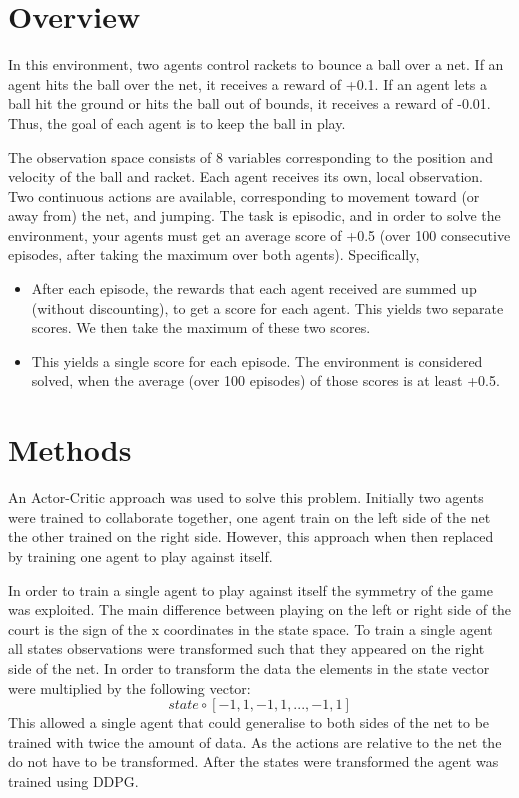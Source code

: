 \documentclass[12pt]{article}
\begin{document}
\maketitle


\section{Overview}

In this environment, two agents control rackets to bounce a ball over a net. 
If an agent hits the ball over the net, it receives a reward of +0.1. 
If an agent lets a ball hit the ground or hits the ball out of bounds, it receives a reward of -0.01. 
Thus, the goal of each agent is to keep the ball in play.

The observation space consists of 8 variables corresponding to the position and velocity of the ball and racket. 
Each agent receives its own, local observation. 
Two continuous actions are available, corresponding to movement toward (or away from) the net, and jumping.
The task is episodic, and in order to solve the environment, your agents must get an average score of +0.5 (over 100 consecutive episodes, after taking the maximum over both agents).
Specifically,
\begin{itemize}
\item After each episode, the rewards that each agent received are summed up (without discounting), to get a score for each agent. 
This yields two separate scores. 
We then take the maximum of these two scores.
\item This yields a single score for each episode.
The environment is considered solved, when the average (over 100 episodes) of those scores is at least +0.5.
\end{itemize}

\section{Methods}
\label{methods}
An Actor-Critic approach was used to solve this problem.
Initially two agents were trained to collaborate together, one agent train on the left side of the net the other trained on the right side.
However, this approach when then replaced by training one agent to play against itself.

In order to train a single agent to play against itself the symmetry of the game was exploited.
The main difference between playing on the left or right side of the court is the sign of the x coordinates in the state space.
To train a single agent all states observations were transformed such that they appeared on the right side of the net.
In order to transform the data the elements in the state vector were multiplied by the following vector:
\begin{equation}
state \circ [-1,1,-1,1,...,-1,1]
\end{equation}
This allowed a single agent that could generalise to both sides of the net to be trained with twice the amount of data.
As the actions are relative to the net the do not have to be transformed.
After the states were transformed the agent was trained using DDPG.
\end{document}
